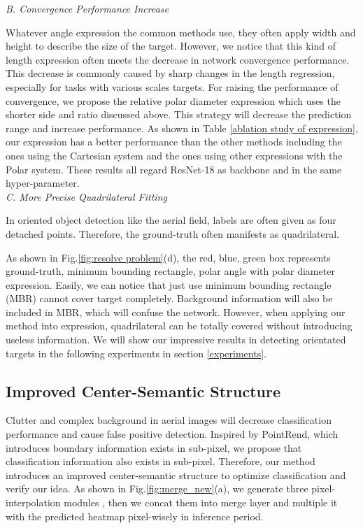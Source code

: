 \documentclass[10pt,twocolumn]{article}
\begin{document}
\emph{B. Convergence Performance Increase}\label{RCS}

Whatever angle expression the common methods use, they often apply width and height to describe the size of the target. However, we notice that this kind of length expression often meets the decrease in network convergence performance. This decrease is commonly caused by sharp changes in the length regression, especially for tasks with various scales targets. For raising the performance of convergence, we propose the relative polar diameter expression which uses the shorter side and ratio discussed above. This strategy will decrease the prediction range and increase performance. As shown in Table \ref{ablation study of expression}, our expression has a better performance than the other methods including the ones using the Cartesian system and the ones using other expressions with the Polar system. These results all regard ResNet-18 as backbone and in the same hyper-parameter.
\\

\emph{C. More Precise Quadrilateral Fitting}

In oriented object detection like the aerial field, labels are often given as four detached points. Therefore, the ground-truth often manifests as quadrilateral.

As shown in Fig.\ref{fig:resolve problem}(d), the red, blue, green box represents ground-truth, minimum bounding rectangle, polar angle with polar diameter expression. Easily, we can notice that just use minimum bounding rectangle (MBR) cannot cover target completely. Background information will also be included in MBR, which will confuse the network. However, when applying our method into expression, quadrilateral can be totally covered without introducing useless information. We will show our impressive results in detecting orientated targets in the following experiments in section \ref{experiments}.

\subsection{Improved Center-Semantic Structure}\label{Center_Semantic}
Clutter and complex background in aerial images will decrease classification performance and cause false positive detection.  Inspired by PointRend\cite{kirillov2020pointrend}, which introduces boundary information exists in sub-pixel, we propose that classification information also exists in sub-pixel. Therefore, our method introduces an improved center-semantic structure to optimize classification and verify our idea. As shown in Fig.\ref{fig:merge_new}(a), we generate three pixel-interpolation modules , then we concat them into merge layer  and multiple it with the predicted heatmap pixel-wisely in inference period.
\end{document}
